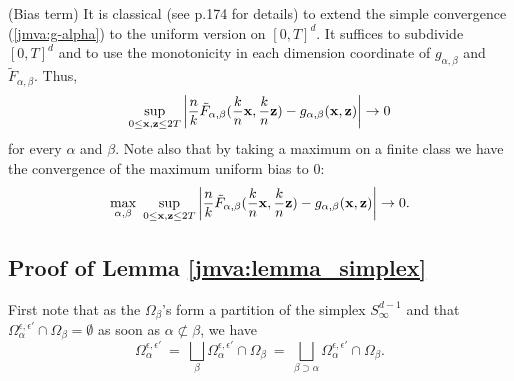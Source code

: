 \begin{remark}({\sc Bias term})
\label{jmva:rk:bias}
It is classical (see \cite{Qi97} p.174 for details) to extend the simple convergence (\ref{jmva:g-alpha}) to the uniform version on $[0,T]^d$. It suffices to subdivide $[0,T]^d$ and to use the monotonicity in each dimension coordinate of $g_{\alpha, \beta}$ and $\tilde F_{\alpha, \beta}$.
Thus,  
$$\sup_{0 \le \mathbf x, \mathbf z \le 2T}\left|\frac{n}{k} \tilde F_{\alpha, \beta}( \frac{k}{n} \mathbf x, \frac{k}{n} \mathbf z)- g_{\alpha, \beta}(\mathbf x, \mathbf z)\right| \to 0$$ for every $\alpha$ and $\beta$. Note also that by taking a maximum on a finite class we have the convergence of the maximum uniform bias to $0$:
\begin{align}
\label{jmva:unif_conv}
\max_{\alpha, \beta}~ \sup_{0 \le \mathbf x, \mathbf z \le 2T}\left|\frac{n}{k} \tilde F_{\alpha, \beta}( \frac{k}{n} \mathbf x, \frac{k}{n} \mathbf z)-g_{\alpha, \beta} (\mathbf x, \mathbf z)\right| \to 0.
\end{align}
\noindent
\end{remark}

\subsection{Proof of Lemma \ref{jmva:lemma_simplex}}
First note that as the $\Omega_\beta$'s
form a partition of the simplex $S_\infty^{d-1}$ and that $\Omega_\alpha^{\epsilon,\epsilon'} \cap \Omega_\beta = \emptyset $ as soon as $\alpha \not \subset \beta$, we have 
$$\Omega_{\alpha}^{\epsilon, \epsilon'} ~=~ \bigsqcup_\beta
\Omega_\alpha^{\epsilon, \epsilon'} \cap \Omega_\beta ~=~ \bigsqcup_{\beta \supset
  \alpha} \Omega_\alpha^{\epsilon, \epsilon'} \cap \Omega_\beta .$$ 

